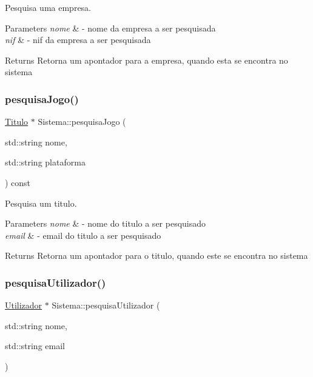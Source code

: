 Pesquisa uma empresa. 


\begin{DoxyParams}{Parameters}
{\em nome} & -\/ nome da empresa a ser pesquisada \\
\hline
{\em nif} & -\/ nif da empresa a ser pesquisada \\
\hline
\end{DoxyParams}
\begin{DoxyReturn}{Returns}
Retorna um apontador para a empresa, quando esta se encontra no sistema 
\end{DoxyReturn}
\mbox{\label{class_sistema_a0fb81a4685bb24024295c89d22d6d719}} 
\subsubsection{\texorpdfstring{pesquisa\+Jogo()}{pesquisaJogo()}}
{\footnotesize\ttfamily \mbox{\hyperlink{class_titulo}{Titulo}} $\ast$ Sistema\+::pesquisa\+Jogo (\begin{DoxyParamCaption}\item[{std\+::string}]{nome,  }\item[{std\+::string}]{plataforma }\end{DoxyParamCaption}) const}



Pesquisa um titulo. 


\begin{DoxyParams}{Parameters}
{\em nome} & -\/ nome do titulo a ser pesquisado \\
\hline
{\em email} & -\/ email do titulo a ser pesquisado \\
\hline
\end{DoxyParams}
\begin{DoxyReturn}{Returns}
Retorna um apontador para o titulo, quando este se encontra no sistema 
\end{DoxyReturn}
\mbox{\label{class_sistema_a6f2d2d67cb8464771272e60511045032}} 
\subsubsection{\texorpdfstring{pesquisa\+Utilizador()}{pesquisaUtilizador()}}
{\footnotesize\ttfamily \mbox{\hyperlink{class_utilizador}{Utilizador}} $\ast$ Sistema\+::pesquisa\+Utilizador (\begin{DoxyParamCaption}\item[{std\+::string}]{nome,  }\item[{std\+::string}]{email }\end{DoxyParamCaption})}



